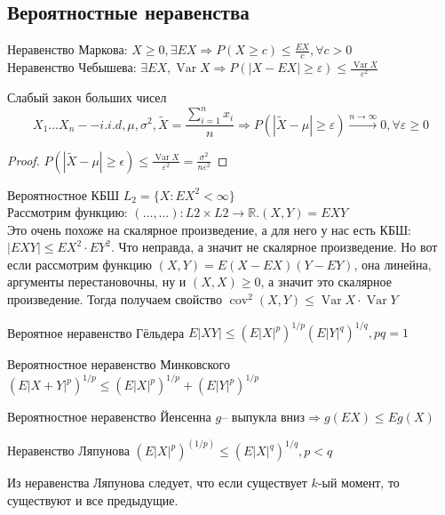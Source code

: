 \documentclass{article}
\DeclareMathOperator{\Var}{Var}
\DeclareMathOperator{\cov}{cov}
\begin{document}
    \subsection{Вероятностные неравенства}
    Неравенство Маркова: $ X \ge 0, \exists EX \Rightarrow P(X\ge c) \le \frac{EX}{c}, \forall c > 0 $\\
    Неравенство Чебышева: $\exists EX, \Var X \Rightarrow P(|X-EX|\ge\varepsilon) \le\frac{\Var X}{\varepsilon^2}$
    \begin{claim}{Слабый закон больших чисел}
        $$X_1 \dots X_n -- i.i.d , \mu, \sigma^2, \widetilde{X} = \frac{\sum\limits_{i=1}^n x_i}{n} \Rightarrow P(|\widetilde{X} - \mu| \ge \varepsilon) \xrightarrow{n \to \infty} 0, \forall \varepsilon \ge 0$$
        \begin{proof}
            
        $ P(|\widetilde{X} - \mu| \ge \epsilon)\le \frac{\Var X}{\varepsilon^2} = \frac{\sigma^2}{n \varepsilon^2}$
        \end{proof}
    \end{claim}
    \begin{definition}{Вероятностное КБШ}
        $ L_2 = \{X: EX^2 < \infty\}$\\
        Рассмотрим функцию: $(\dots, \dots): L2\times L2 \to \mathbb R. (X, Y) = EXY$ \\
        Это очень похоже на скалярное произведение, а для него у нас есть КБШ: $|EXY| \le EX^2 \cdot EY^2$. Что неправда, а значит не скалярное произведение. 
        Но вот если рассмотрим функцию $(X, Y) = E(X-EX)(Y-EY)$, она линейна, аргументы перестановочны, ну и $(X, X) \ge 0$, а значит это скалярное произведение.
        Тогда получаем свойство $\cov^2(X, Y) \le \Var X \cdot \Var Y$
    \end{definition}
    \begin{definition}{Вероятное неравенство Гёльдера}
        $E|XY| \le (E|X|^p)^{1/p} (E|Y|^q)^{1/q},  pq = 1$
    \end{definition}
    \begin{definition}{Вероятностное неравенство Минковского}
        $(E|X+Y|^p)^{1/p} \le (E|X|^p)^{1/p} + (E|Y|^p)^{1/p}$
    \end{definition}
    \begin{definition}{Вероятностное неравенство Йенсенна}
        $g \text {-- выпукла вниз} \Rightarrow g(EX) \le Eg(X)$
    \end{definition}
    \begin{definition}{Неравенство Ляпунова}
        $(E|X|^p)^(1/p) \le (E|X|^q)^{1/q}, p < q$
    \end{definition}
    \begin{remark}
        Из неравенства Ляпунова следует, что если существует $k$-ый момент, то существуют и все предыдущие.
    \end{remark}
\end{document}
